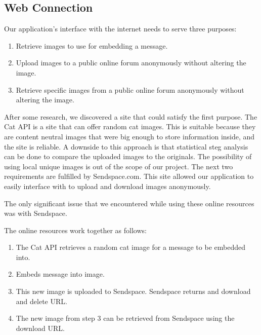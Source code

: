 \subsection{Web Connection}

Our application's interface with the internet needs to serve three purposes:
\begin{enumerate}
\item Retrieve images to use for embedding a message. 
\item Upload images to a public online forum anonymously without altering the image.
\item Retrieve specific images from a public online forum anonymously without altering the image. 
\end{enumerate}

After some research, we discovered a site that could satisfy the first purpose. The Cat API is a site that can offer random cat images. This is suitable because they are content neutral images that were big enough to store information inside, and the site is reliable. A downside to this approach is that statistical steg analysis can be done to compare the uploaded images to the originals. The possibility of using local unique images is out of the scope of our project. The next two requirements are fulfilled by Sendspace.com. This site allowed our application to easily interface with to upload and download images anonymously. 

The only significant issue that we encountered while using these online resources was with Sendspace.

The online resources work together as follows:
\begin{enumerate}
\item The Cat API retrieves a random cat image for a message to be embedded into.
\item Embeds message into image.
\item This new image is uploaded to Sendspace. Sendspace returns and download and delete URL.
\item The new image from step 3 can be retrieved from Sendspace using the download URL. 
\end{enumerate}











